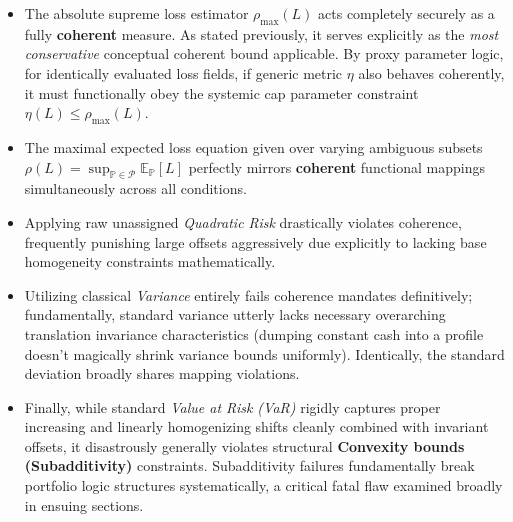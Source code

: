 \begin{itemize}
    \item The absolute supreme loss estimator $\rho_{\max}(L)$ acts completely securely as a fully \textbf{coherent} measure. As stated previously, it serves explicitly as the \textit{most conservative} conceptual coherent bound applicable. By proxy parameter logic, for identically evaluated loss fields, if generic metric $\eta$ also behaves coherently, it must functionally obey the systemic cap parameter constraint $\eta(L) \leq \rho_{\max}(L)$.
    \item The maximal expected loss equation given over varying ambiguous subsets $\rho(L) = \sup_{\mathbb{P} \in \mathcal{P}} \mathbb{E}_{\mathbb{P}}[L]$ perfectly mirrors \textbf{coherent} functional mappings simultaneously across all conditions.
    \item Applying raw unassigned \textit{Quadratic Risk} drastically violates coherence, frequently punishing large offsets aggressively due explicitly to lacking base homogeneity constraints mathematically.
    \item Utilizing classical \textit{Variance} entirely fails coherence mandates definitively; fundamentally, standard variance utterly lacks necessary overarching translation invariance characteristics (dumping constant cash into a profile doesn't magically shrink variance bounds uniformly). Identically, the standard deviation broadly shares mapping violations.
    \item Finally, while standard \textit{Value at Risk (VaR)} rigidly captures proper increasing and linearly homogenizing shifts cleanly combined with invariant offsets, it disastrously generally violates structural \textbf{Convexity bounds (Subadditivity)} constraints. Subadditivity failures fundamentally break portfolio logic structures systematically, a critical fatal flaw examined broadly in ensuing sections.
\end{itemize}
